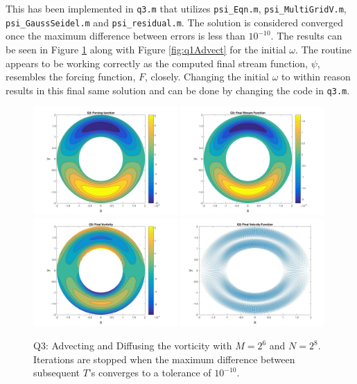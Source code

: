 \documentclass{article}
\begin{document}
This has been implemented in \texttt{q3.m} that utilizes \texttt{psi\_Eqn.m}, \texttt{psi\_MultiGridV.m}, \texttt{psi\_GaussSeidel.m} and \texttt{psi\_residual.m}. The solution is considered converged once the maximum difference between errors is less than $10^{-10}$. The results can be seen in Figure \ref{fig:q3} along with Figure \ref{fig:q1Advect} for the initial $\omega$. The routine appears to be working correctly as the computed final stream function, $\psi$, resembles the forcing function, $F$, closely. Changing the initial $\omega$ to within reason results in this final same solution and can be done by changing the code in \texttt{q3.m}.
	\begin{figure}[h!]
		\centering
		\includegraphics[width = 0.49\textwidth]{fig_q3F}
		\includegraphics[width = 0.49\textwidth]{fig_q3psi}
		\includegraphics[width = 0.49\textwidth]{fig_q3omega}
		\includegraphics[width = 0.49\textwidth]{fig_q3u}
		\caption{Q3: Advecting and Diffusing the vorticity with $M = 2^6$ and $N=2^8$. Iterations are stopped when the maximum difference between subsequent $T$'s converges to a tolerance of $10^{-10}$.}
		\label{fig:q3}
	\end{figure}
\end{document}
